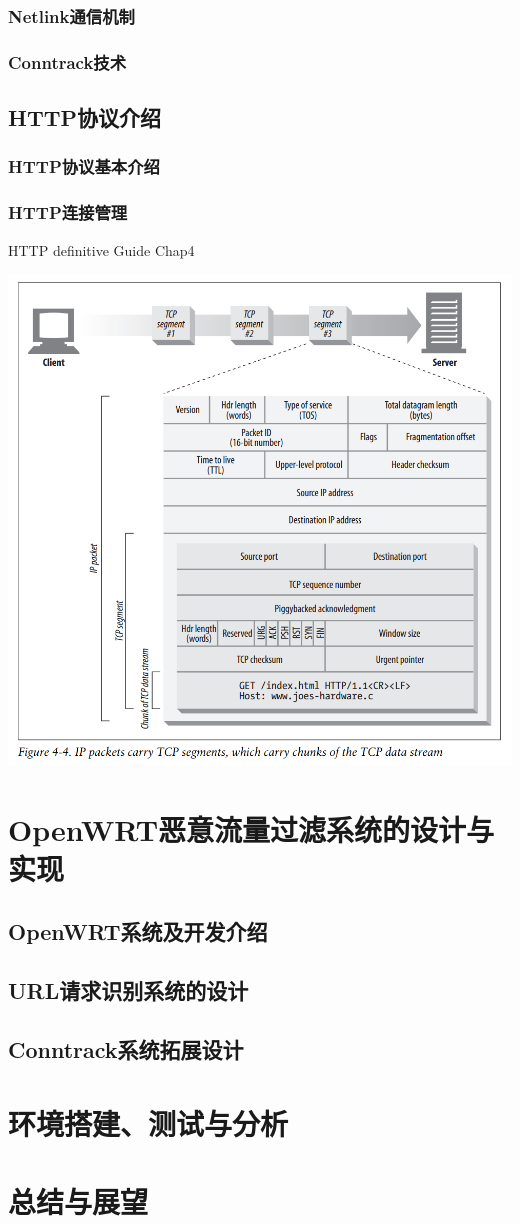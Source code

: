 \documentclass[a4paper,onecolumn,UTF8]{ctexart}
\begin{document}
\subsubsection{Netlink通信机制}
\subsubsection{Conntrack技术}
\subsection{HTTP协议介绍}
\subsubsection{HTTP协议基本介绍}
\subsubsection{HTTP连接管理}
HTTP definitive Guide Chap4
\begin{center}
  \includegraphics[width=.8\textwidth]{./pic/tcp_segment_data.png}
\end{center}
\section{OpenWRT恶意流量过滤系统的设计与实现}
\subsection{OpenWRT系统及开发介绍}
\subsection{URL请求识别系统的设计}
\subsection{Conntrack系统拓展设计}
\section{环境搭建、测试与分析}
\section{总结与展望}
\end{document}
